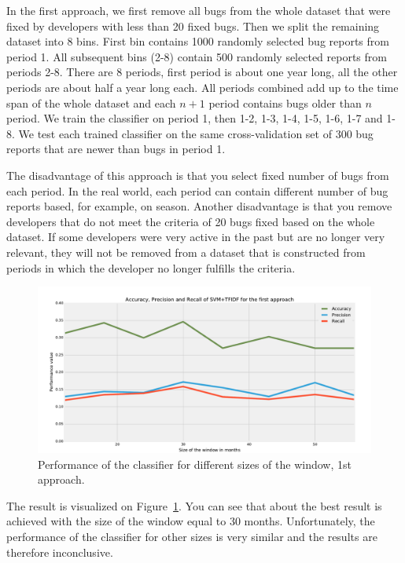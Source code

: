 In the first approach, we first remove all bugs from the whole dataset that were fixed by developers with less than 20 fixed bugs. Then we split the remaining dataset into 8 bins. First bin contains 1000 randomly selected bug reports from period 1. All subsequent bins (2-8) contain 500 randomly selected reports from periods 2-8. There are 8 periods, first period is about one year long, all the other periods are about half a year long each. All periods combined add up to the time span of the whole dataset and each $n+1$ period contains bugs older than $n$ period. We train the classifier on period 1, then 1-2, 1-3, 1-4, 1-5, 1-6, 1-7 and 1-8. We test each trained classifier on the same cross-validation set of 300 bug reports that are newer than bugs in period 1.

The disadvantage of this approach is that you select fixed number of bugs from each period. In the real world, each period can contain different number of bug reports based, for example, on season. Another disadvantage is that you remove developers that do not meet the criteria of 20 bugs fixed based on the whole dataset. If some developers were very active in the past but are no longer very relevant, they will not be removed from a dataset that is constructed from periods in which the developer no longer fulfills the criteria.

\begin{figure}[htbp]
    \centering
        \includegraphics[width=\textwidth]{./images/window_size/firefox_1a.pdf}
    \caption{Performance of the classifier for different sizes of the window, 1st approach.}
    \label{fig:window.firefox.1a}
\end{figure}

The result is visualized on Figure~\ref{fig:window.firefox.1a}. You can see that about the best result is achieved with the size of the window equal to 30 months. Unfortunately, the performance of the classifier for other sizes is very similar and the results are therefore inconclusive.

